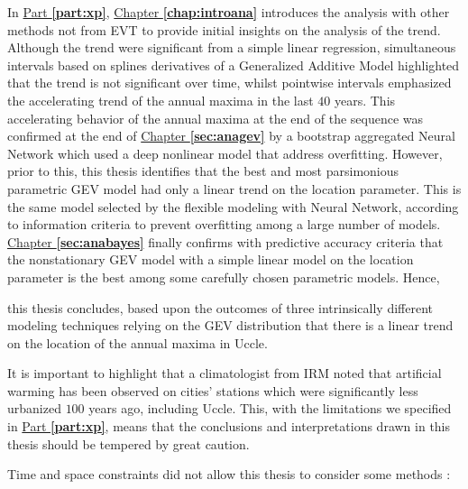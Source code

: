 \documentclass[11pt,a4paper,openany, twosided]{book}
\begin{document}
In \hyperref[part:xp]{Part \textbf{\ref{part:xp}}},  \hyperref[chap:introana]{Chapter \textbf{\ref{chap:introana}}} introduces the analysis with other methods not from EVT to provide initial insights on the analysis of the trend. Although the trend were significant from a simple linear regression, simultaneous intervals based on splines derivatives of a Generalized Additive Model highlighted that the trend is not significant over time, whilst pointwise intervals emphasized the accelerating trend of the annual maxima in the last $40$ years. This accelerating behavior of the annual maxima at the end of the sequence was confirmed at the end of \hyperref[sec:anagev]{Chapter \textbf{\ref{sec:anagev}}} by a bootstrap aggregated Neural Network which used a deep nonlinear model that address overfitting. However, prior to this, this thesis identifies that the best and most parsimonious parametric GEV model had only a linear trend on the location parameter. This is the same model selected by the flexible modeling with Neural Network, according to information criteria to prevent overfitting among a large number of models. \hyperref[sec:anabayes]{Chapter \textbf{\ref{sec:anabayes}}} finally confirms  with predictive accuracy criteria that the nonstationary GEV model with a simple linear model on the location parameter is the best among some carefully chosen parametric models. Hence,
\vspace{.2cm}
\begin{tcolorbox}
	this thesis concludes, based upon the outcomes of three intrinsically different modeling techniques relying on the GEV distribution that there is a linear trend on the location of the annual maxima in Uccle.
\end{tcolorbox}
It is important to highlight that a climatologist from IRM noted that artificial warming has been observed on cities' stations which were significantly less urbanized $100$ years ago, including Uccle. This,  with the limitations we specified in \hyperref[part:xp]{Part \textbf{\ref{part:xp}}}, means that the conclusions and interpretations drawn in this thesis should be tempered by great caution.
\newline

Time and space constraints did not allow this thesis to consider some methods : 
\end{document}
